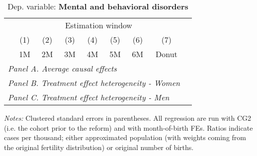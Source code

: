 \begin{table}[H] \begin{threeparttable} \centering \caption{Dep. variable: \textbf{Mental and behavioral disorders}} {\def\sym#1{\ifmmode^{#1}\else\(^{#1}\)\fi} \begin{tabular}{l*{8}{c}} \toprule & \multicolumn{7}{c}{Estimation window} \\ \cmidrule(lr){2-8}
            &\multicolumn{1}{c}{(1)}&\multicolumn{1}{c}{(2)}&\multicolumn{1}{c}{(3)}&\multicolumn{1}{c}{(4)}&\multicolumn{1}{c}{(5)}&\multicolumn{1}{c}{(6)}&\multicolumn{1}{c}{(7)}\\
            &\multicolumn{1}{c}{1M}&\multicolumn{1}{c}{2M}&\multicolumn{1}{c}{3M}&\multicolumn{1}{c}{4M}&\multicolumn{1}{c}{5M}&\multicolumn{1}{c}{6M}&\multicolumn{1}{c}{Donut}\\
\midrule
 \multicolumn{8}{l}{\emph{Panel A. Average causal effects}} \\       \midrule\multicolumn{8}{l}{\emph{Panel B. Treatment effect heterogeneity - Women}} \\       \midrule\multicolumn{8}{l}{\emph{Panel C. Treatment effect heterogeneity - Men}} \\       
\bottomrule \end{tabular} } \begin{tablenotes} \item \scriptsize \emph{Notes:} Clustered standard errors in parentheses. All regression are run with CG2 (i.e. the cohort prior to the reform) and with month-of-birth FEs. Ratios indicate cases per thousand; either approximated population (with weights coming from the original fertility distribution) or original number of births. \end{tablenotes} \end{threeparttable} \end{table} 
